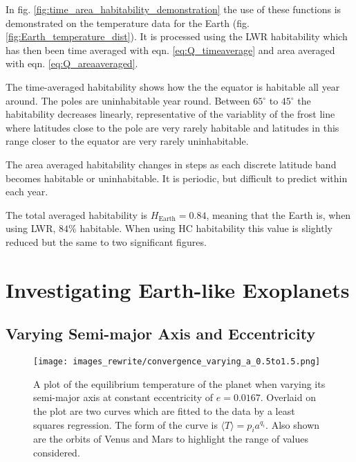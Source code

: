 \documentclass[12pt, onecolumn]{revtex4-2}    %
\newcommand{\degrees}{\ensuremath{^{\circ}}}
\begin{document}
In fig. \ref{fig:time_area_habitability_demonstration} the use of these functions is demonstrated on the temperature data for the Earth (fig. \ref{fig:Earth_temperature_dist}).
It is processed using the LWR habitability which has then been time averaged with eqn. \eqref{eq:Q_timeaverage} and area averaged with eqn. \eqref{eq:Q_areaaveraged}.

The time-averaged habitability shows how the the equator is habitable all year around.
The poles are uninhabitable year round.
Between $65\degrees$ to $45\degrees$ the habitability decreases linearly, representative of the variablity of the frost line where latitudes close to the pole are very rarely habitable and latitudes in this range closer to the equator are very rarely uninhabitable.

The area averaged habitability changes in steps as each discrete latitude band becomes habitable or uninhabitable.
It is periodic, but difficult to predict within each year.

The total averaged habitability is $H_\text{Earth} = 0.84$, meaning that the Earth is, when using LWR, $84\%$ habitable.
When using HC habitability this value is slightly reduced but the same to two significant figures.

\section{Investigating Earth-like Exoplanets} \label{sec:Exoplanets}
%
\subsection{Varying Semi-major Axis and Eccentricity} \label{ssec:InvTimeAveragedSolarFlux}
%
\begin{figure}[t]
  \texttt{[image: images\_rewrite/convergence\_varying\_a\_0.5to1.5.png]}
  \caption{
    A plot of the equilibrium temperature of the planet when varying its semi-major axis at constant eccentricity of $e=0.0167$.
    Overlaid on the plot are two curves which are fitted to the data by a least squares regression.
    The form of the curve is $\langle T \rangle = p_i a^{q_i}$.
    Also shown are the orbits of Venus and Mars to highlight the range of values considered.
  }
  \label{fig:planet_semimajoraxis}
\end{figure}
\end{document}
